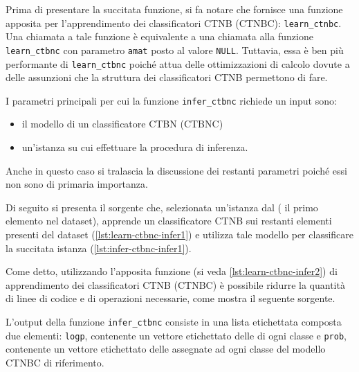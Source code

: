 Prima di presentare la succitata funzione, si fa notare che \rctbn{} fornisce una funzione apposita per l'apprendimento dei classificatori \acs{CTNB} (\acs{CTNBC}): \lstinline[language=rstats]{learn_ctnbc}. Una chiamata a tale funzione è equivalente a una chiamata alla funzione \lstinline[language=rstats]{learn_ctbnc} con parametro \lstinline$amat$ posto al valore \lstinline$NULL$. Tuttavia, essa è ben più performante di \lstinline[language=rstats]{learn_ctbnc} poiché attua delle ottimizzazioni di calcolo dovute a delle assunzioni che la struttura dei classificatori \acs{CTNB} permettono di fare.

I parametri principali per cui la funzione \lstinline[language=rstats]{infer_ctbnc} richiede un input sono:
\begin{itemize}
	\item il modello di un classificatore \acs{CTBN} (\acs{CTBNC})
	\item un'istanza su cui effettuare la procedura di inferenza.
\end{itemize}
Anche in questo caso si tralascia la discussione dei restanti parametri poiché essi non sono di primaria importanza.

Di seguito si presenta il sorgente che, selezionata un'istanza dal  (\ie{} il primo elemento nel dataset), apprende un classificatore \acs{CTNB} sui restanti elementi presenti del dataset (\autoref{lst:learn-ctbnc-infer1}) e utilizza tale modello per classificare la succitata istanza (\autoref{lst:infer-ctbnc-infer1}).

\cleardoublepage
{}

Come detto, utilizzando l'apposita funzione (si veda \autoref{lst:learn-ctbnc-infer2}) di apprendimento dei classificatori \acs{CTNB} (\acs{CTNBC}) è possibile ridurre la quantità di linee di codice e di operazioni necessarie, come mostra il seguente sorgente.

\vspace*{8pt}

L'output della funzione \lstinline[language=rstats]{infer_ctbnc} consiste in una lista etichettata composta due elementi: \lstinline$logp$, contenente un vettore etichettato delle \emph{} di ogni classe e \lstinline$prob$, contenente un vettore etichettato delle \emph{} assegnate ad ogni classe del modello \acs{CTNBC} di riferimento.

